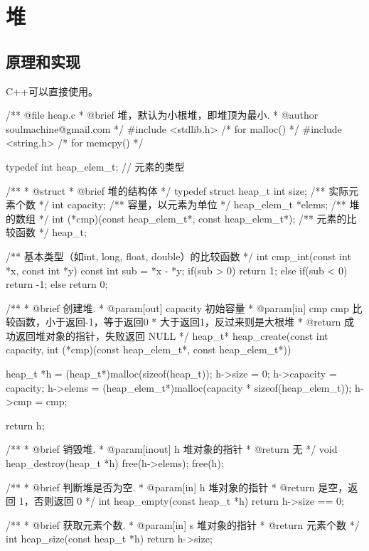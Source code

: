 \section{堆} %

\subsection{原理和实现}
C++可以直接使用。

\begin{Codex}[label=heap.c]
/** @file heap.c
 * @brief 堆，默认为小根堆，即堆顶为最小.
 * @author soulmachine@gmail.com
 */
#include <stdlib.h>  /* for malloc() */
#include <string.h>  /* for memcpy() */

typedef int heap_elem_t; // 元素的类型

/**
 * @struct
 * @brief 堆的结构体
 */
typedef struct heap_t {
    int     size;   /** 实际元素个数 */
    int     capacity; /** 容量，以元素为单位 */
    heap_elem_t  *elems;   /** 堆的数组 */
    int (*cmp)(const heap_elem_t*, const heap_elem_t*);   /** 元素的比较函数 */
}heap_t;


/** 基本类型（如int, long, float, double）的比较函数 */
int cmp_int(const int *x, const int *y) {
    const int sub = *x - *y;
    if(sub > 0) {
        return 1;
    } else if(sub < 0) {
        return -1;
    } else {
        return 0;
    }
}

/**
 * @brief 创建堆.
 * @param[out] capacity 初始容量
 * @param[in] cmp cmp 比较函数，小于返回-1，等于返回0
 *            大于返回1，反过来则是大根堆
 * @return 成功返回堆对象的指针，失败返回 NULL
 */
heap_t* heap_create(const int capacity,
        int (*cmp)(const heap_elem_t*, const heap_elem_t*)) {
    heap_t *h = (heap_t*)malloc(sizeof(heap_t));
    h->size = 0;
    h->capacity = capacity;
    h->elems = (heap_elem_t*)malloc(capacity * sizeof(heap_elem_t));
    h->cmp = cmp;

    return h;
}

/**
 * @brief 销毁堆.
 * @param[inout] h 堆对象的指针
 * @return 无
 */
void heap_destroy(heap_t *h) {
    free(h->elems);
    free(h);
}


/**
 * @brief 判断堆是否为空.
 * @param[in] h 堆对象的指针
 * @return 是空，返回 1，否则返回 0
 */
int heap_empty(const heap_t *h) {
    return h->size == 0;
}

/**
 * @brief 获取元素个数.
 * @param[in] s 堆对象的指针
 * @return 元素个数
 */
int heap_size(const heap_t *h) {
    return h->size;
}


\end{Codex}
